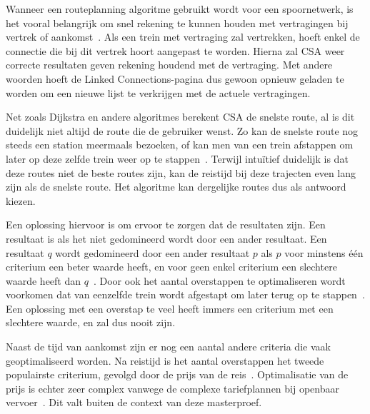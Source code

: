 Wanneer een routeplanning algoritme gebruikt wordt voor een spoornetwerk, is het vooral belangrijk om snel rekening te kunnen houden met vertragingen bij vertrek of aankomst~\citep{strasser14,strasser17}. Als een trein met vertraging zal vertrekken, hoeft enkel de connectie die bij dit vertrek hoort aangepast te worden. Hierna zal CSA weer correcte resultaten geven rekening houdend met de vertraging. Met andere woorden hoeft de Linked Connections-pagina dus gewoon opnieuw geladen te worden om een nieuwe lijst te verkrijgen met de actuele vertragingen. 

Net zoals Dijkstra en andere algoritmes berekent CSA de snelste route, al is dit duidelijk niet altijd de route die de gebruiker wenst. Zo kan de snelste route nog steeds een station meermaals bezoeken, of kan men van een trein afstappen om later op deze zelfde trein weer op te stappen~\citep{strasser14}. Terwijl intuïtief duidelijk is dat deze routes niet de beste routes zijn, kan de reistijd bij deze trajecten even lang zijn als de snelste route. Het algoritme kan dergelijke routes dus als antwoord kiezen.

Een oplossing hiervoor is om ervoor te zorgen dat de resultaten  zijn. Een resultaat is  als het niet gedomineerd wordt door een ander resultaat. Een resultaat $q$ wordt gedomineerd door een ander resultaat $p$ als $p$ voor minstens één criterium een beter waarde heeft, en voor geen enkel criterium een slechtere waarde heeft dan $q$~\citep{hannemann08,strasser17}. Door ook het aantal overstappen te optimaliseren wordt voorkomen dat van eenzelfde trein wordt afgestapt om later terug op te stappen~\citep{strasser14}. Een oplossing met een overstap te veel heeft immers een criterium met een slechtere waarde, en zal dus nooit  zijn.

Naast de tijd van aankomst zijn er nog een aantal andere criteria die vaak geoptimaliseerd worden. Na reistijd is het aantal overstappen het tweede populairste criterium, gevolgd door de prijs van de reis~\citep{strasser17}. Optimalisatie van de prijs is echter zeer complex vanwege de complexe tariefplannen bij openbaar vervoer~\citep{muller06}. Dit valt buiten de context van deze masterproef.

